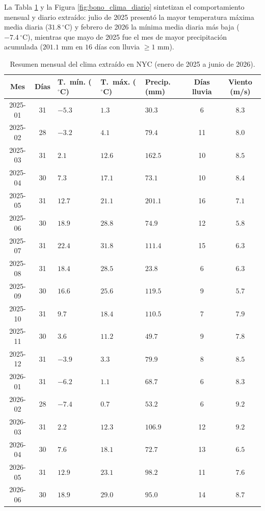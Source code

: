 \documentclass[11pt,a4paper]{article}
\begin{document}
La Tabla \ref{tab:clima_mensual_nyc} y la Figura \ref{fig:bono_clima_diario} sintetizan el comportamiento mensual y diario extraído: julio de 2025 presentó la mayor temperatura máxima media diaria ($31.8\,^\circ\text{C}$) y febrero de 2026 la mínima media diaria más baja ($-7.4\,^\circ\text{C}$), mientras que mayo de 2025 fue el mes de mayor precipitación acumulada ($201.1\text{ mm}$ en $16$ días con lluvia $\ge 1\text{ mm}$).

\begin{table}[H]
\centering
\scriptsize
\caption{Resumen mensual del clima extraído en NYC (enero de 2025 a junio de 2026).}
\label{tab:clima_mensual_nyc}
\setlength{\tabcolsep}{4pt}
\begin{tabularx}{\linewidth}{c c >{\centering\arraybackslash}X >{\centering\arraybackslash}X >{\centering\arraybackslash}X c c}
\toprule
\textbf{Mes} & \textbf{Días} & \textbf{T.~mín. ($^{\circ}$C)} & \textbf{T.~máx. ($^{\circ}$C)} & \textbf{Precip. (mm)} & \textbf{Días lluvia} & \textbf{Viento (m/s)} \\
\midrule
2025-01 & 31 & $-5.3$ & $1.3$ & $30.3$ & 6 & $8.3$ \\
2025-02 & 28 & $-3.2$ & $4.1$ & $79.4$ & 11 & $8.0$ \\
2025-03 & 31 & $2.1$ & $12.6$ & $162.5$ & 10 & $8.5$ \\
2025-04 & 30 & $7.3$ & $17.1$ & $73.1$ & 10 & $8.4$ \\
2025-05 & 31 & $12.7$ & $21.1$ & $201.1$ & 16 & $7.1$ \\
2025-06 & 30 & $18.9$ & $28.8$ & $74.9$ & 12 & $5.8$ \\
2025-07 & 31 & $22.4$ & $31.8$ & $111.4$ & 15 & $6.3$ \\
2025-08 & 31 & $18.4$ & $28.5$ & $23.8$ & 6 & $6.3$ \\
2025-09 & 30 & $16.6$ & $25.6$ & $119.5$ & 9 & $5.7$ \\
2025-10 & 31 & $9.7$ & $18.4$ & $110.5$ & 7 & $7.9$ \\
2025-11 & 30 & $3.6$ & $11.2$ & $49.7$ & 9 & $7.8$ \\
2025-12 & 31 & $-3.9$ & $3.3$ & $79.9$ & 8 & $8.5$ \\
2026-01 & 31 & $-6.2$ & $1.1$ & $68.7$ & 6 & $8.3$ \\
2026-02 & 28 & $-7.4$ & $0.7$ & $53.2$ & 6 & $9.2$ \\
2026-03 & 31 & $2.2$ & $12.3$ & $106.9$ & 12 & $9.2$ \\
2026-04 & 30 & $7.6$ & $18.1$ & $72.7$ & 13 & $6.5$ \\
2026-05 & 31 & $12.9$ & $23.1$ & $98.2$ & 11 & $7.6$ \\
2026-06 & 30 & $18.9$ & $29.0$ & $95.0$ & 14 & $8.7$ \\
\bottomrule
\end{tabularx}
\end{table}
\end{document}
